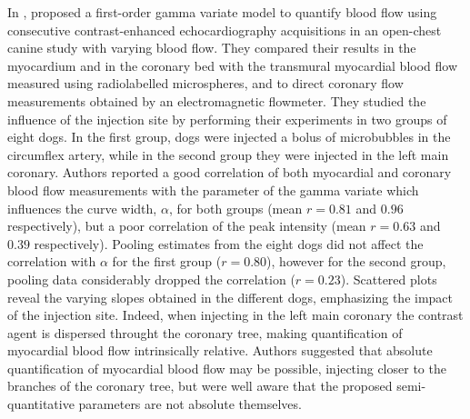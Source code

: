 In \citeyear{Kaul:1989il}, \citet{Kaul:1989il} proposed a first-order gamma variate model to quantify blood flow using consecutive contrast-enhanced echocardiography acquisitions in an open-chest canine study with varying blood flow. 
They compared their results in the myocardium and in the coronary bed with the transmural myocardial blood flow measured using radiolabelled microspheres, and to direct coronary flow measurements obtained by an electromagnetic flowmeter. 
They studied the influence of the injection site by performing their experiments in two groups of eight dogs. 
In the first group, dogs were injected a bolus of microbubbles in the circumflex artery, while in the second group they were injected in the left main coronary.
Authors reported a good correlation of both myocardial and coronary blood flow measurements with the parameter of the gamma variate which influences the curve width, $\alpha$, for both groups (mean $r = 0.81$ and $0.96$ respectively), but a poor correlation of the peak intensity (mean $r = 0.63$ and $0.39$ respectively). 
Pooling estimates from the eight dogs did not affect the correlation with $\alpha$ for the first group ($r = 0.80$), however for the second group, pooling data considerably dropped the correlation ($r = 0.23$).
Scattered plots reveal the varying slopes obtained in the different dogs, emphasizing the impact of the injection site.
Indeed, when injecting in the left main coronary the contrast agent is dispersed throught the coronary tree, making quantification of myocardial blood flow intrinsically relative.
Authors suggested that absolute quantification of myocardial blood flow may be possible, injecting closer to the branches of the coronary tree, but were well aware that the proposed semi-quantitative parameters are not absolute themselves.

